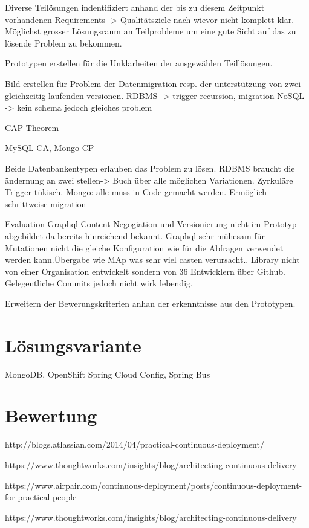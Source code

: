 Diverse Teilösungen indentifiziert anhand der bis zu diesem Zeitpunkt vorhandenen Requirements -> Qualitätsziele nach wievor nicht komplett klar.
Möglichst grosser Lösungsraum an Teilprobleme um eine gute Sicht auf das zu lösende Problem zu bekommen.

Prototypen erstellen für die Unklarheiten der ausgewählen Teillösungen.

Bild erstellen für Problem der Datenmigration resp. der unterstützung von zwei gleichzeitig laufenden versionen.
RDBMS -> trigger recursion, migration
NoSQL -> kein schema jedoch gleiches problem

CAP Theorem

MySQL CA, Mongo CP

Beide Datenbankentypen erlauben das Problem zu lösen. RDBMS braucht die ändernung an zwei stellen-> Buch über alle möglichen Variationen. Zyrkuläre Trigger tükisch. Mongo: alle muss in Code gemacht werden. Ermöglich schrittweise migration


Evaluation Graphql
Content Negogiation und Versionierung nicht im Prototyp abgebildet da bereits hinreichend bekannt.
Graphql sehr mühesam für Mutationen nicht die gleiche Konfiguration wie für die Abfragen verwendet werden kann.Übergabe wie MAp was sehr viel casten verursacht.. Library nicht von einer Organisation entwickelt sondern von 36 Entwicklern über Github. Gelegentliche Commits jedoch nicht wirk lebendig. 

Erweitern der Bewerungskriterien anhan der erkenntnisse aus den Prototypen.

\section{Lösungsvariante}

MongoDB, OpenShift Spring Cloud Config, Spring Bus

\section{Bewertung}

http://blogs.atlassian.com/2014/04/practical-continuous-deployment/

https://www.thoughtworks.com/insights/blog/architecting-continuous-delivery

https://www.airpair.com/continuous-deployment/posts/continuous-deployment-for-practical-people

https://www.thoughtworks.com/insights/blog/architecting-continuous-delivery

